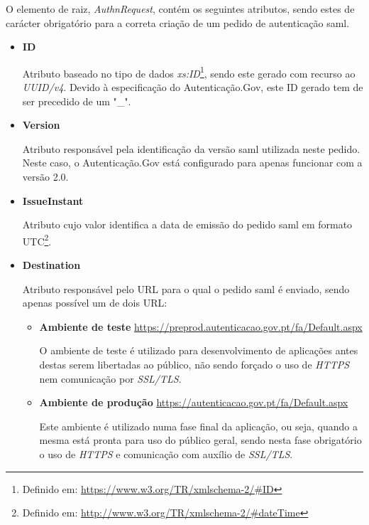 \vspace{-7mm}
O elemento de raiz, \emph{AuthnRequest}, contém os seguintes atributos, sendo estes de carácter obrigatório para a correta criação de um pedido de autenticação \gls{saml}.

\begin{itemize}
    \item \textbf{ID}
    
    Atributo baseado no tipo de dados \emph{xs:ID}\footnote{Definido em: \url{https://www.w3.org/TR/xmlschema-2/\#ID}}, sendo este gerado com recurso ao \emph{UUID\//v4}. Devido à especificação do Autenticação.Gov, este ID gerado tem de ser precedido de um "\_".
    
    \item \textbf{Version}
    
    Atributo responsável pela identificação da versão \gls{saml} utilizada neste pedido. Neste caso, o Autenticação.Gov está configurado para apenas funcionar com a versão 2.0.
    
    \item \textbf{IssueInstant}
    
    Atributo cujo valor identifica a data de emissão do pedido \gls{saml} em formato UTC\footnote{Definido em: \url{http://www.w3.org/TR/xmlschema-2/\#dateTime}}.
    
    \item \textbf{Destination}
    
    Atributo responsável pelo URL para o qual o pedido \gls{saml} é enviado, sendo apenas possível um de dois URL:
    \begin{itemize}
        \item \textbf{Ambiente de teste } \url{https://preprod.autenticacao.gov.pt/fa/Default.aspx}
        
        O ambiente de teste é utilizado para desenvolvimento de aplicações antes destas serem libertadas ao público, não sendo forçado o uso de \emph{HTTPS} nem comunicação por \emph{SSL/TLS}.
        
        \item \textbf{Ambiente de produção } \url{https://autenticacao.gov.pt/fa/Default.aspx} 
        
        Este ambiente é utilizado numa fase final da aplicação, ou seja, quando a mesma está pronta para uso do público geral, sendo nesta fase obrigatório o uso de \emph{HTTPS} e comunicação com auxílio de \emph{SSL/TLS}.
    \end{itemize}
    

\end{itemize}
